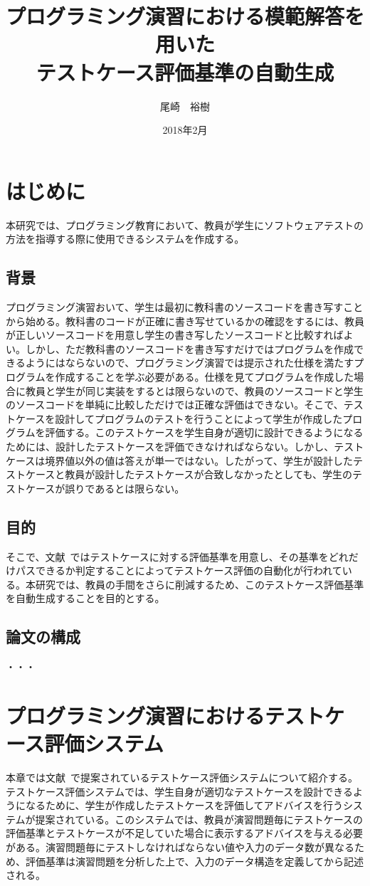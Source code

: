 \documentclass{tpu-sotu}
\author{尾崎　裕樹}
\title{プログラミング演習における模範解答を用いた\\テストケース評価基準の自動生成}
\date{2018年2月}
\begin{document}
%
\maketitle
\clearpage
{}
\tableofcontents
\clearpage
{}
%

%
\chapter{はじめに}
本研究では、プログラミング教育において、教員が学生にソフトウェアテストの方法を指導する際に使用できるシステムを作成する。
\section{背景}
プログラミング演習おいて、学生は最初に教科書のソースコードを書き写すことから始める。教科書のコードが正確に書き写せているかの確認をするには、教員が正しいソースコードを用意し学生の書き写したソースコードと比較すればよい。しかし、ただ教科書のソースコードを書き写すだけではプログラムを作成できるようにはならないので、プログラミング演習では提示された仕様を満たすプログラムを作成することを学ぶ必要がある。仕様を見てプログラムを作成した場合に教員と学生が同じ実装をするとは限らないので、教員のソースコードと学生のソースコードを単純に比較しただけでは正確な評価はできない。そこで、テストケースを設計してプログラムのテストを行うことによって学生が作成したプログラムを評価する。このテストケースを学生自身が適切に設計できるようになるためには、設計したテストケースを評価できなければならない。しかし、テストケースは境界値以外の値は答えが単一ではない。したがって、学生が設計したテストケースと教員が設計したテストケースが合致しなかったとしても、学生のテストケースが誤りであるとは限らない。
\section{目的}
そこで、文献~\cite{a1}ではテストケースに対する評価基準を用意し、その基準をどれだけパスできるか判定することによってテストケース評価の自動化が行われている。本研究では、教員の手間をさらに削減するため、このテストケース評価基準を自動生成することを目的とする。
\section{論文の構成}
  ・・・
\chapter{プログラミング演習におけるテストケース評価システム}
本章では文献~\cite{a1}で提案されているテストケース評価システムについて紹介する。テストケース評価システムでは、学生自身が適切なテストケースを設計できるようになるために、学生が作成したテストケースを評価してアドバイスを行うシステムが提案されている。このシステムでは、教員が演習問題毎にテストケースの評価基準とテストケースが不足していた場合に表示するアドバイスを与える必要がある。演習問題毎にテストしなければならない値や入力のデータ数が異なるため、評価基準は演習問題を分析した上で、入力のデータ構造を定義してから記述される。
\end{document}
